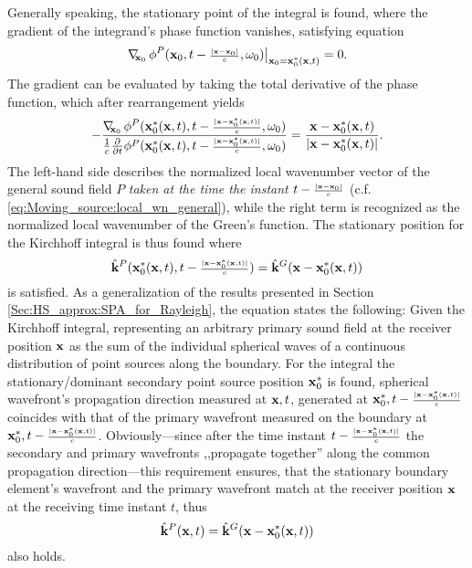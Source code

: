 Generally speaking, the stationary point of the integral is found, where the gradient of the integrand's phase function vanishes, satisfying equation
\begin{equation}
\left. \nabla_{\!\!\mathbf{x}_0}\, \phi^P(\mathbf{x}_0,t-{\scriptstyle \frac{|\mathbf{x}-\mathbf{x}_0|}{c} },\omega_0) \right|_{\mathbf{x}_0 = \mathbf{x}_0^*(\mathbf{x},t)} = 0.
\end{equation} 
The gradient can be evaluated by taking the total derivative of the phase function, which after rearrangement yields
\begin{equation}
-\frac{\nabla_{\!\!\mathbf{x}_0}\, \phi^P(\mathbf{x}_0^*(\mathbf{x},t),t-{\scriptstyle \frac{|\mathbf{x}-\mathbf{x}_0^*(\mathbf{x},t)|}{c} },\omega_0) }{\frac{1}{c}\frac{\partial }{\partial t}\phi^P(\mathbf{x}_0^*(\mathbf{x},t),t-{\scriptstyle \frac{|\mathbf{x}-\mathbf{x}_0^*(\mathbf{x},t)|}{c} },\omega_0) } = \frac{\mathbf{x}-\mathbf{x}_0^*(\mathbf{x},t)}{|\mathbf{x}-\mathbf{x}_0^*(\mathbf{x},t)|}.
\end{equation}
The left-hand side describes the normalized local wavenumber vector of the general sound field $P$ \emph{taken at the time the instant $t-{\scriptstyle \frac{|\mathbf{x}-\mathbf{x}_0|}{c} }$} (c.f. \eqref{eq:Moving_source:local_wn_general}), while the right term is recognized as the normalized local wavenumber of the Green's function. 
The stationary position for the Kirchhoff integral is thus found where
\begin{equation}
\label{Eq:moving_sources:moving_point_stat_point_1}
\hat{\mathbf{k}}^P(\mathbf{x}_0^*(\mathbf{x},t),t-{\scriptstyle \frac{|\mathbf{x}-\mathbf{x}_0^*(\mathbf{x},t)|}{c} }) = \hat{\mathbf{k}}^G(\mathbf{x}-\mathbf{x}_0^*(\mathbf{x},t))
\end{equation}
is satisfied.
As a generalization of the results presented in Section \ref{Sec:HS_approx:SPA_for_Rayleigh}, the equation states the following:
Given the Kirchhoff integral, representing an arbitrary primary sound field at the receiver position $\mathbf{x}$ as the sum of the individual spherical waves of a continuous distribution of point sources along the boundary.
For the integral the stationary/dominant secondary point source position $\mathbf{x}_0^*$ is found,  spherical wavefront's propagation direction measured at $\mathbf{x},t$, generated at $\mathbf{x}_0^*, t-{\scriptstyle \frac{|\mathbf{x}-\mathbf{x}_0^*(\mathbf{x},t)|}{c} }$ coincides with that of the primary wavefront measured on the boundary at $\mathbf{x}_0^*, t-{\scriptstyle \frac{|\mathbf{x}-\mathbf{x}_0^*(\mathbf{x},t)|}{c} }$.
Obviously---since after the time instant $t-{\scriptstyle \frac{|\mathbf{x}-\mathbf{x}_0^*(\mathbf{x},t)|}{c} }$ the secondary and primary wavefronts ,,propagate together'' along the common propagation direction---this requirement ensures, that the stationary boundary element's wavefront and the primary wavefront match at the receiver position $\mathbf{x}$ at the receiving time instant $t$, thus 
\begin{equation}
\hat{\mathbf{k}}^P(\mathbf{x},t) = \hat{\mathbf{k}}^G(\mathbf{x}-\mathbf{x}_0^*(\mathbf{x},t))
\end{equation}
also holds.
%
